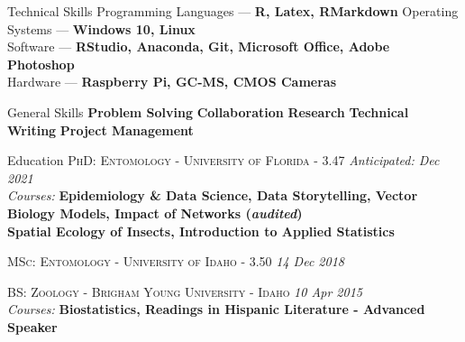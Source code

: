 \documentclass{resume} %
\begin{document}
\begin{rSection}{Technical Skills}
Programming Languages --- \textbf{R, Latex, RMarkdown} \hfill  Operating Systems --- \textbf{Windows 10, Linux}\\
Software --- \textbf{RStudio, Anaconda, Git, Microsoft Office, Adobe Photoshop}\\
Hardware --- \textbf{Raspberry Pi, GC-MS, CMOS Cameras}
\end{rSection}

\begin{rSection}{General Skills}
\textbf{Problem Solving} \hfil \textbf{Collaboration} \hfil
\textbf{Research} \hfil
\textbf{Technical Writing} \hfil 
\textbf{Project Management}
\end{rSection}

\begin{rSection}{Education}
	\textsc{PhD: Entomology - University of Florida - 3.47} \hfill {\em Anticipated: Dec 2021}\\
	\textit{Courses:}  \textbf{Epidemiology \& Data Science, Data Storytelling, Vector Biology Models, Impact of Networks ({\em audited})\\
	Spatial Ecology of Insects, Introduction to Applied Statistics} \hfill
	
	\textsc{MSc: Entomology - University of Idaho - 3.50} \hfill {\em 14 Dec 2018}
	
	\textsc{BS: Zoology - Brigham Young University - Idaho} \hfill {\em 10 Apr 2015}\\ \textit{Courses:} \textbf{Biostatistics, Readings in Hispanic Literature - Advanced Speaker}\\ \hfill
\end{rSection}
\end{document}
